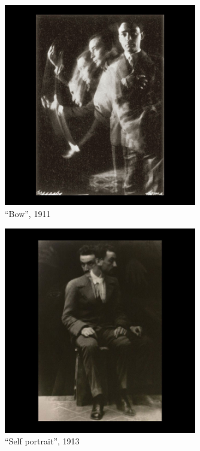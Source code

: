 \documentclass[
]{book}
\begin{document}
\begin{figure}
\centering
\includegraphics[width=0.75\textwidth,height=\textheight]{medias/corpus/bragaglia/Anton-Giulio-Bragaglia-fotodinamica-05.jpg}
\caption{``Bow'', 1911}
\end{figure}

\begin{figure}
\centering
\includegraphics[width=0.75\textwidth,height=\textheight]{medias/corpus/bragaglia/Anton-Giulio-Bragaglia-fotodinamica-06.jpg}
\caption{``Self portrait'', 1913}
\end{figure}
\end{document}
